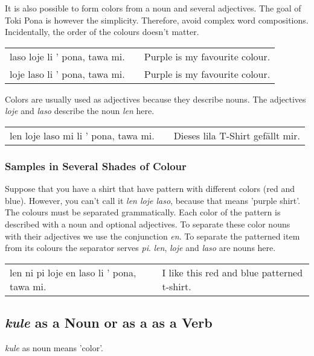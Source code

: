 It is also possible to form colors from a noun and several adjectives. 
The goal of Toki Pona is however the simplicity.
Therefore, avoid complex word compositions.
Incidentally, the order of the colours doesn't matter.

\begin{supertabular}{p{5,5cm}|ll}
laso loje  li ' pona, tawa mi. && Purple is my favourite colour.  \\ %
loje laso  li ' pona, tawa mi. && Purple is my favourite colour.  \\
\end{supertabular}

Colors are usually used as adjectives because they describe nouns. 
The adjectives \textit{loje} and \textit{laso} describe the noun \textit{len} here.

\begin{supertabular}{p{5,5cm}|ll}
len loje laso mi li ' pona, tawa mi. && Dieses lila T-Shirt gefällt mir. \\
\end{supertabular}

%
%
\subsubsection*{Samples in Several Shades of Colour}
%
%
Suppose that you have a shirt that have pattern with different colors (red and blue). 
However, you can't call it \textit{len loje laso}, because that means 'purple shirt'. 
The colours must be separated grammatically. 
Each color of the pattern is described with a noun and optional adjectives. 
To separate these color nouns with their adjectives we use the conjunction \textit{en}.
To separate the patterned item from its colours the separator serves \textit{pi}.
\textit{len}, \textit{loje} and \textit{laso} are nouns here. 

\begin{supertabular}{p{5,5cm}|ll}
len ni pi loje en laso li ' pona, tawa mi. && I like this red and blue patterned t-shirt. \\
\end{supertabular} 
%
\subsection*{\textit{kule} as a Noun or as a as a Verb}
%
%
\textit{kule} as noun means 'color'. 

